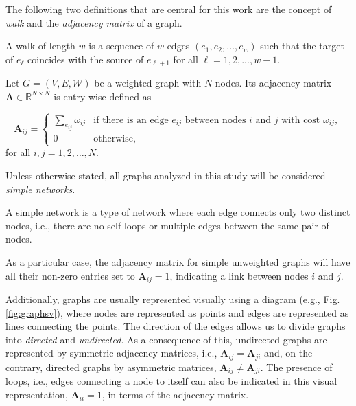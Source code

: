 The following two definitions that are central for this work are the concept of \textit{walk} and the \textit{adjacency matrix} of a graph.  

\begin{definition}
    A walk of length $w$ is a sequence of $w$ edges $(e_1, e_2, \dots, e_w)$ such that the target of $e_\ell$ coincides with the source of $e_{\ell+1}$ for all $\ell=1, 2, ..., w−1$.
\end{definition}
  
\begin{definition}
	Let $G =(V, E, \mathcal{W})$ be a weighted graph with $N$ nodes. Its adjacency matrix $\mathbf{A}\in\mathbb{R}^{N\times N}$ is entry-wise defined as
 
 \begin{equation}
  \mathbf{A}_{ij} =
    \begin{cases}
      \sum_{e_{ij}}\omega_{ij} & \text{if there is an edge $e_{ij}$ between nodes $i$ and $j$ with cost $\omega_{ij}$},\\
      0 & \text{otherwise},
    \end{cases}       
\end{equation}
for all $i, j = 1,2,\dots, N$.
\end{definition}

Unless otherwise stated, all graphs analyzed in this study will be considered \textit{simple networks}.

\begin{definition}
    A simple network is a type of network where each edge connects only two distinct nodes, i.e., there are no self-loops or multiple edges between the same pair of nodes. 
\end{definition}
As a particular case, the adjacency matrix for simple unweighted graphs will have all their non-zero entries set to $\mathbf{A}_{ij}=1$, indicating a link between nodes $i$ and $j$.

Additionally, graphs are usually represented visually using a diagram (e.g., Fig. \ref{fig:graphsv}), where nodes are represented as points and edges are represented as lines connecting the points. The direction of the edges allows us to divide graphs into \textit{directed} and \textit{undirected}. As a consequence of this, undirected graphs are represented by symmetric adjacency matrices, i.e., $\mathbf{A}_{ij}=\mathbf{A}_{ji}$ and, on the contrary, directed graphs by asymmetric matrices, $\mathbf{A}_{ij}\ne \mathbf{A}_{ji}$. The presence of loops, i.e., edges connecting a node to itself can also be indicated in this visual representation, $\mathbf{A}_{ii} = 1$, in terms of the adjacency matrix.

